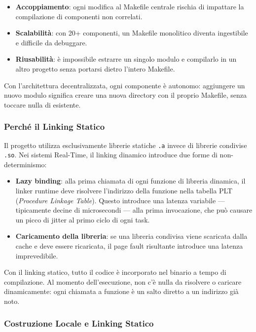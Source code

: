 \begin{itemize}
	\item \textbf{Accoppiamento}: ogni modifica al Makefile centrale rischia di impattare la compilazione di componenti non correlati.
	\item \textbf{Scalabilità}: con 20+ componenti, un Makefile monolitico diventa ingestibile e difficile da debuggare.
	\item \textbf{Riusabilità}: è impossibile estrarre un singolo modulo e compilarlo in un altro progetto senza portarsi dietro l'intero Makefile.
\end{itemize}

Con l'architettura decentralizzata, ogni componente è autonomo: aggiungere un nuovo modulo significa creare una nuova directory con il proprio Makefile, senza toccare nulla di esistente.

\subsubsection{Perché il Linking Statico}

Il progetto utilizza esclusivamente librerie statiche \texttt{.a} invece di librerie condivise \texttt{.so}. Nei sistemi Real-Time, il linking dinamico introduce due forme di non-determinismo:
\begin{itemize}
	\item \textbf{Lazy binding}: alla prima chiamata di ogni funzione di libreria dinamica, il linker runtime deve risolvere l'indirizzo della funzione nella tabella PLT (\textit{Procedure Linkage Table}). Questo introduce una latenza variabile — tipicamente decine di microsecondi — alla prima invocazione, che può causare un picco di jitter al primo ciclo di ogni task.
	\item \textbf{Caricamento della libreria}: se una libreria condivisa viene scaricata dalla cache e deve essere ricaricata, il page fault risultante introduce una latenza imprevedibile.
\end{itemize}
Con il linking statico, tutto il codice è incorporato nel binario a tempo di compilazione. Al momento dell'esecuzione, non c'è nulla da risolvere o caricare dinamicamente: ogni chiamata a funzione è un salto diretto a un indirizzo già noto.

\subsubsection{Costruzione Locale e Linking Statico}

